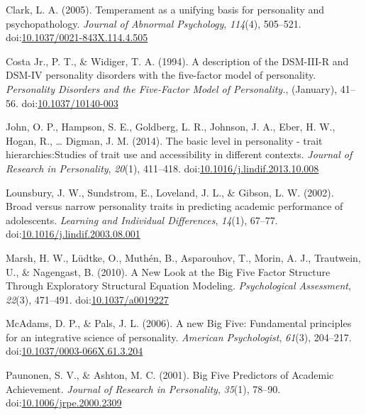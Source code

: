 \documentclass[,man,floatsintext]{apa6}
\theoremstyle{definition}
\theoremstyle{definition}
\theoremstyle{definition}
\theoremstyle{remark}
\begin{document}
\leavevmode\hypertarget{ref-Clark2005}{}%
Clark, L. A. (2005). Temperament as a unifying basis for personality and
psychopathology. \emph{Journal of Abnormal Psychology}, \emph{114}(4),
505--521.
doi:\href{https://doi.org/10.1037/0021-843X.114.4.505}{10.1037/0021-843X.114.4.505}

\leavevmode\hypertarget{ref-Widiger1994}{}%
Costa Jr., P. T., \& Widiger, T. A. (1994). A description of the
DSM-III-R and DSM-IV personality disorders with the five-factor model of
personality. \emph{Personality Disorders and the Five-Factor Model of
Personality.}, (January), 41--56.
doi:\href{https://doi.org/10.1037/10140-003}{10.1037/10140-003}

\leavevmode\hypertarget{ref-Ziegler2014}{}%
John, O. P., Hampson, S. E., Goldberg, L. R., Johnson, J. A., Eber, H.
W., Hogan, R., \ldots{} Digman, J. M. (2014). The basic level in
personality - trait hierarchies:Studies of trait use and accessibility
in different contexts. \emph{Journal of Research in Personality},
\emph{20}(1), 411--418.
doi:\href{https://doi.org/10.1016/j.lindif.2013.10.008}{10.1016/j.lindif.2013.10.008}

\leavevmode\hypertarget{ref-Lounsbury2002}{}%
Lounsbury, J. W., Sundstrom, E., Loveland, J. L., \& Gibson, L. W.
(2002). Broad versus narrow personality traits in predicting academic
performance of adolescents. \emph{Learning and Individual Differences},
\emph{14}(1), 67--77.
doi:\href{https://doi.org/10.1016/j.lindif.2003.08.001}{10.1016/j.lindif.2003.08.001}

\leavevmode\hypertarget{ref-Marsh2010}{}%
Marsh, H. W., Lüdtke, O., Muthén, B., Asparouhov, T., Morin, A. J.,
Trautwein, U., \& Nagengast, B. (2010). A New Look at the Big Five
Factor Structure Through Exploratory Structural Equation Modeling.
\emph{Psychological Assessment}, \emph{22}(3), 471--491.
doi:\href{https://doi.org/10.1037/a0019227}{10.1037/a0019227}

\leavevmode\hypertarget{ref-McAdams2006a}{}%
McAdams, D. P., \& Pals, J. L. (2006). A new Big Five: Fundamental
principles for an integrative science of personality. \emph{American
Psychologist}, \emph{61}(3), 204--217.
doi:\href{https://doi.org/10.1037/0003-066X.61.3.204}{10.1037/0003-066X.61.3.204}

\leavevmode\hypertarget{ref-Paunonen2001}{}%
Paunonen, S. V., \& Ashton, M. C. (2001). Big Five Predictors of
Academic Achievement. \emph{Journal of Research in Personality},
\emph{35}(1), 78--90.
doi:\href{https://doi.org/10.1006/jrpe.2000.2309}{10.1006/jrpe.2000.2309}
\end{document}
